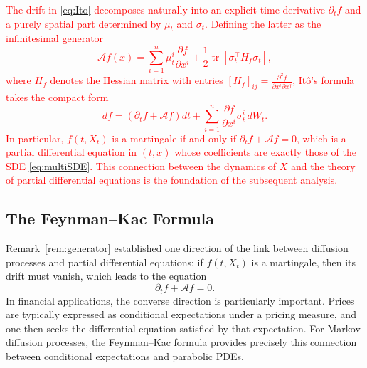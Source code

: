 \textcolor{red}{
\begin{remark}
The drift in \eqref{eq:Ito} decomposes naturally into an explicit 
time derivative $\partial_t f$ and a purely spatial part determined by 
$\mu_t$ and $\sigma_t$. Defining the latter as the infinitesimal generator
\begin{equation}
    \mathcal{A}f(x) = \sum_{i=1}^n \mu_t^i \frac{\partial f}{\partial x^i}
    + \frac{1}{2}\operatorname{tr}\!\left[\sigma_t^\top H_f \sigma_t\right],
\end{equation}
where $H_f$ denotes the Hessian matrix with entries 
$[H_f]_{ij} = \frac{\partial^2 f}{\partial x^i \partial x^j}$, 
Itô's formula takes the compact form
\begin{equation}
    df = \left(\partial_t f + \mathcal{A}f\right)dt 
    + \sum_{i=1}^n \frac{\partial f}{\partial x^i}\sigma_t^i\, dW_t.
\end{equation}
In particular, $f(t, X_t)$ is a martingale if and only if 
$\partial_t f + \mathcal{A}f = 0$, which is a partial differential 
equation in $(t,x)$ whose coefficients are exactly those of the 
SDE \eqref{eq:multiSDE}. This connection between the dynamics of $X$ 
and the theory of partial differential equations is the foundation 
of the subsequent analysis.
\end{remark}
}












\newpage

\subsection{The Feynman--Kac Formula}
\label{subsec:fk}

Remark~\ref{rem:generator} established one direction of the link between diffusion processes and partial differential equations: if $f(t,X_t)$ is a martingale, then its drift must vanish, which leads to the equation
\[
\partial_t f + \mathcal{A}f = 0.
\]
In financial applications, the converse direction is particularly important. Prices are typically expressed as conditional expectations under a pricing measure, and one then seeks the differential equation satisfied by that expectation. For Markov diffusion processes, the Feynman--Kac formula provides precisely this connection between conditional expectations and parabolic PDEs.

